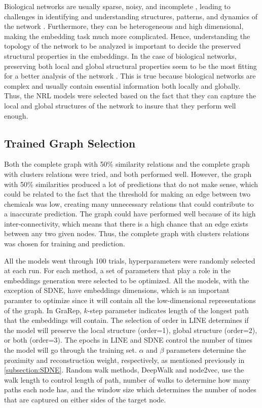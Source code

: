 Biological networks are usually sparse, noisy, and incomplete \cite{nickel_review_2016}, leading to challenges in identifying and understanding structures, patterns, and dynamics of the network \cite{wang_unsupervised_2016}. Furthermore, they can be heterogeneous and high dimensional, making the embedding task much more complicated. Hence, understanding the topology of the network to be analyzed is important to decide the preserved structural properties in the embeddings. In the case of biological networks, preserving both local and global structural properties seem to be the most fitting for a better analysis of the network \cite{su_network_2018}. This is true because biological networks are complex and usually contain essential information both locally and globally. Thus, the \ac{NRL} models were selected based on the fact that they can capture the local and global structures of the network to insure that they perform well enough.

\subsection{Trained Graph Selection}
Both the complete graph with 50\% similarity relations and the complete graph with clusters relations were tried, and both performed well. However, the graph with 50\% similarities produced a lot of predictions that do not make sense, which could be related to the fact that the threshold for making an edge between two chemicals was low, creating many unnecessary relations that could contribute to a inaccurate prediction. The graph could have performed well because of its high inter-connectivity, which means that there is a high chance that an edge exists between any two given nodes. Thus, the complete graph with clusters relations was chosen for training and prediction.

All the models went through 100 trials, hyperparameters were randomly selected at each run. For each method, a set of parameters that play a role in the embeddings generation were selected to be optimized. All the models, with the exception of SDNE, have embeddings dimensions, which is an important paramter to optimize since it will contain all the low-dimensional representations of the graph. In GraRep, $k$-step parameter indicates length of the longest path that the embeddings will contain. The selection of order in \ac{LINE} determines if the model will preserve the local structure (order=1), global structure (order=2), or both (order=3). The epochs in \ac{LINE} and \ac{SDNE} control the number of times the model will go through the training set. $\alpha$ and $\beta$ parameters determine the proximity and reconstruction weight, respectively, as mentioned previously in \ref{subsection:SDNE}. Random walk methods, DeepWalk and node2vec, use the walk length to control length of path, number of walks to determine how many paths each node has, and the window size which determines the number of nodes that are captured on either sides of the target node.

